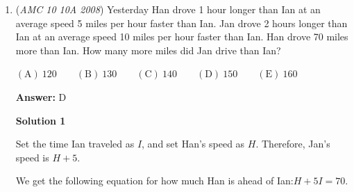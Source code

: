 \begin{enumerate}
 By the \href{https://artofproblemsolving.com/wiki/index.php?title=Pythagorean\_Theorem}{Pythagorean Theorem}, the diagonal is $\sqrt{(3x)^2+(4x)^2}=5x = 27$. So $x=\frac{27}{5}$. 

 Since the movie and the screen have the same width, $2y=4x\Rightarrow y=2x$. 

 Thus, the height of each strip is $\frac{3x-y}{2}=\frac{3x-2x}{2}=\frac{x}{2}=\frac{27}{10}=2.7\Longrightarrow\mathrm{(D)}$.

 


 


 



\textbf{Solution 2}

If the ratio is 4:3, and the diagonal is 27, two sides must have been multiplied by a factor of 27/5 to result in the diagonal being 27 (Since 3,4,5 forms a right triangle), multiplying by 27/5, we get width=108/5, height=81/5. From there, we can set up an equation, as it states that after the letterbox has been applied, the aspect ratio became 2:1. 

 We observe that the aspect ratio only takes away from the screen's height, not width. So, if we call X, the height of one darkening strip, we can write this equation: 
 \[\frac{\frac{108}{5}}{\frac{81}{5} - 2x} = 2\]. 

 Therefore, $x = \frac{27}{10} = 2.7$.

 
Thus, the answer is $\text{\textbf{(D)}}$.

 


	\item (\textit{AMC 10 10A 2008}) Yesterday Han drove 1 hour longer than Ian at an average speed 5 miles per hour faster than Ian. Jan drove 2 hours longer than Ian at an average speed 10 miles per hour faster than Ian. Han drove 70 miles more than Ian. How many more miles did Jan drive than Ian?


 $\mathrm{(A)}\ 120\qquad\mathrm{(B)}\ 130\qquad\mathrm{(C)}\ 140\qquad\mathrm{(D)}\ 150\qquad\mathrm{(E)}\ 160$

 \textbf{Answer: }D



\textbf{Solution 1}

Set the time Ian traveled as $I$, and set Han's speed as $H$. Therefore, Jan's speed is $H+5.$

 We get the following equation for how much Han is ahead of Ian:$H+5I = 70.$


\end{enumerate}
